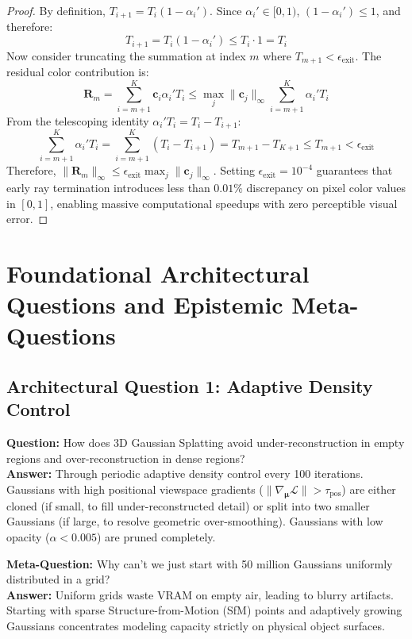 \documentclass[11pt,a4paper]{article}
\theoremstyle{definition}
\begin{document}
\begin{proof}
By definition, $T_{i+1} = T_i (1 - \alpha_i')$. Since $\alpha_i' \in [0, 1)$, $(1 - \alpha_i') \le 1$, and therefore:
{\boldmath
\begin{equation}
T_{i+1} = T_i (1 - \alpha_i') \le T_i \cdot 1 = T_i
\end{equation}
}
Now consider truncating the summation at index $m$ where $T_{m+1} < \epsilon_{\text{exit}}$.
The residual color contribution is:
{\boldmath
\begin{equation}
\mathbf{R}_m = \sum_{i=m+1}^K \mathbf{c}_i \alpha_i' T_i \le \max_j \|\mathbf{c}_j\|_\infty \sum_{i=m+1}^K \alpha_i' T_i
\end{equation}
}
From the telescoping identity $\alpha_i' T_i = T_i - T_{i+1}$:
{\boldmath
\begin{equation}
\sum_{i=m+1}^K \alpha_i' T_i = \sum_{i=m+1}^K (T_i - T_{i+1}) = T_{m+1} - T_{K+1} \le T_{m+1} < \epsilon_{\text{exit}}
\end{equation}
}
Therefore, $\|\mathbf{R}_m\|_\infty \le \epsilon_{\text{exit}} \max_j \|\mathbf{c}_j\|_\infty$.
Setting $\epsilon_{\text{exit}} = 10^{-4}$ guarantees that early ray termination introduces less than $0.01\%$ discrepancy on pixel color values in $[0, 1]$, enabling massive computational speedups with zero perceptible visual error.
\end{proof}

\section{Foundational Architectural Questions and Epistemic Meta-Questions}

\subsection{Architectural Question 1: Adaptive Density Control}
\textbf{Question:} How does 3D Gaussian Splatting avoid under-reconstruction in empty regions and over-reconstruction in dense regions?\\
\textbf{Answer:} Through periodic adaptive density control every 100 iterations. Gaussians with high positional viewspace gradients ($\|\nabla_{\boldsymbol{\mu}} \mathcal{L}\| > \tau_{\text{pos}}$) are either cloned (if small, to fill under-reconstructed detail) or split into two smaller Gaussians (if large, to resolve geometric over-smoothing). Gaussians with low opacity ($\alpha < 0.005$) are pruned completely.

\textbf{Meta-Question:} Why can't we just start with 50 million Gaussians uniformly distributed in a grid?\\
\textbf{Answer:} Uniform grids waste VRAM on empty air, leading to blurry artifacts. Starting with sparse Structure-from-Motion (SfM) points and adaptively growing Gaussians concentrates modeling capacity strictly on physical object surfaces.
\end{document}
